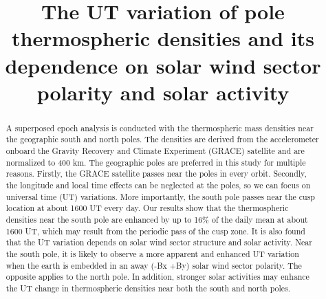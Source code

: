 \documentclass[draft,grl]{/home/gdj/文档/template/agu_template/AGUTeX}
\begin{document}
\title{The UT variation of pole thermospheric densities and its dependence on solar wind sector polarity and solar activity}


\begin{abstract}
A superposed epoch analysis is conducted with the thermospheric mass densities near the geographic south and north poles. The densities are derived from the accelerometer onboard the Gravity Recovery and Climate Experiment (GRACE) satellite and are normalized to 400 km. The geographic poles are preferred in this study for multiple reasons. Firstly, the GRACE satellite passes near the poles in every orbit. Secondly, the longitude and local time effects can be neglected at the poles, so we can focus on universal time (UT) variations. More importantly, the south pole passes near the cusp location at about 1600 UT every day. Our results show that the thermospheric densities near the south pole are enhanced by up to 16\% of the daily mean at about 1600 UT, which may result from the periodic pass of the cusp zone. It is also found that the UT variation depends on solar wind sector structure and solar activity. Near the south pole, it is likely to observe a more apparent and enhanced UT variation when the earth is embedded in an away (-Bx +By) solar wind sector polarity. The opposite applies to the north pole. In addition, stronger solar activities may enhance the UT change in thermospheric densities near both the south and north poles.
\end{abstract}
\end{document}
